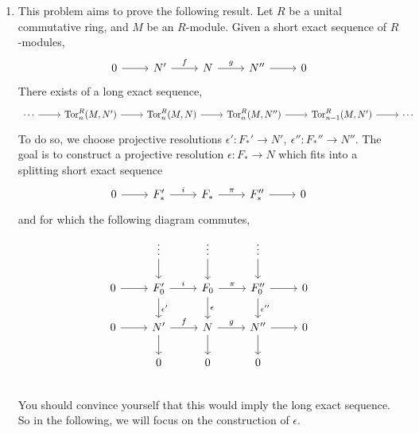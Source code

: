 
\begin{enumerate}
\item This problem aims to prove the following result. Let $R$ be a unital commutative ring, and $M$ be an $R$-module. Given a short exact sequence of $R$-modules,
 \begin{equation*}
        \begin{tikzcd}
            0 \arrow[r] & N' \arrow[r, "f"] &  N \arrow[r, "g"] & N'' \arrow[r] & 0
        \end{tikzcd}
\end{equation*}
There exists of a long exact sequence, 
 \begin{equation*}
        \begin{tikzcd}
            \cdots \arrow[r] & \text{Tor}_n^R(M, N') \arrow[r] &  \text{Tor}_n^R(M, N) \arrow[r] & \text{Tor}_n^R(M, N'') \arrow[r]& \text{Tor}_{n-1}^R(M, N') \arrow[r] &\cdots
        \end{tikzcd}
\end{equation*}
To do so, we choose projective resolutions $\epsilon': F_{*}' \to N', \ \epsilon'': F_{*}'' \to N''$. The goal is to construct a projective resolution $\epsilon: F_{*} \to N$ which fits into a splitting short exact sequence 
 \begin{equation*}
        \begin{tikzcd}
            0 \arrow[r] & F_{*}' \arrow[r, "i"] &  F_{*} \arrow[r, "\pi"] & F_{*}'' \arrow[r] & 0
        \end{tikzcd}
\end{equation*}
and for which the following diagram commutes,
\begin{equation*}
        \begin{tikzcd}
                    & \vdots \arrow[d]  &  \vdots \arrow[d] & \vdots \arrow[d]&  \\
        0 \arrow[r] & F_0' \arrow[r, "i"]\arrow[d, "\epsilon'"]     &  F_0 \arrow[r, "\pi"]\arrow[d, "\epsilon"] & F_0'' \arrow[r]\arrow[d, "\epsilon''"] & 0 \\
        0 \arrow[r] & N' \arrow[r, "f"]\arrow[d]  &  N \arrow[r, "g"]\arrow[d]  & N'' \arrow[r]\arrow[d]  & 0\\
                    & 0                 &  0                & 0             &  \\
        \end{tikzcd}
\end{equation*}
You should convince yourself that this would imply the long exact sequence. So in the following, we will focus on the construction of $\epsilon$.


\end{enumerate}
